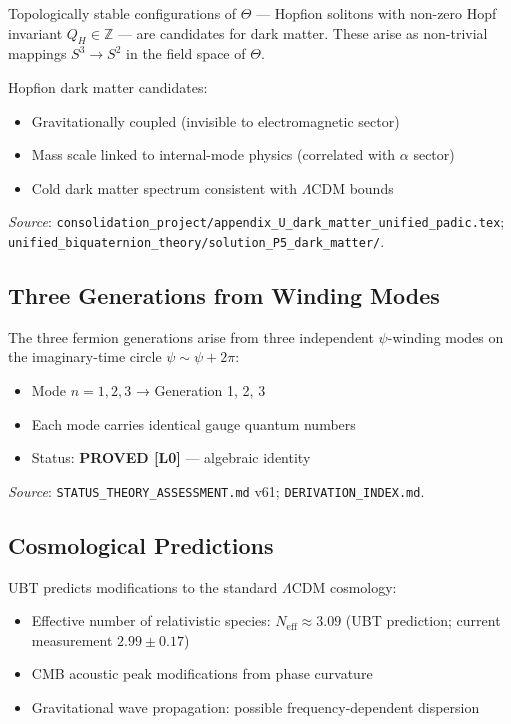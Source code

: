\documentclass[12pt,a4paper]{article}
\begin{document}
Topologically stable configurations of $\Theta$ — Hopfion solitons with
non-zero Hopf invariant $Q_H\in\mathbb{Z}$ — are candidates for dark matter.
These arise as non-trivial mappings $S^3 \to S^2$ in the field space of $\Theta$.

Hopfion dark matter candidates:
\begin{itemize}
  \item Gravitationally coupled (invisible to electromagnetic sector)
  \item Mass scale linked to internal-mode physics (correlated with $\alpha$ sector)
  \item Cold dark matter spectrum consistent with $\Lambda$CDM bounds
\end{itemize}

\textit{Source}: \texttt{consolidation\_project/appendix\_U\_dark\_matter\_unified\_padic.tex};
\texttt{unified\_biquaternion\_theory/solution\_P5\_dark\_matter/}.

\subsection{Three Generations from Winding Modes}

The three fermion generations arise from three independent $\psi$-winding modes
on the imaginary-time circle $\psi \sim \psi + 2\pi$:
\begin{itemize}
  \item Mode $n = 1, 2, 3$ → Generation 1, 2, 3
  \item Each mode carries identical gauge quantum numbers
  \item Status: \textbf{PROVED [L0]} — algebraic identity
\end{itemize}

\textit{Source}: \texttt{STATUS\_THEORY\_ASSESSMENT.md} v61;
\texttt{DERIVATION\_INDEX.md}.

\subsection{Cosmological Predictions}

UBT predicts modifications to the standard $\Lambda$CDM cosmology:
\begin{itemize}
  \item Effective number of relativistic species: $N_{\mathrm{eff}} \approx 3.09$
        (UBT prediction; current measurement $2.99\pm 0.17$)
  \item CMB acoustic peak modifications from phase curvature
  \item Gravitational wave propagation: possible frequency-dependent dispersion
\end{itemize}
\end{document}
